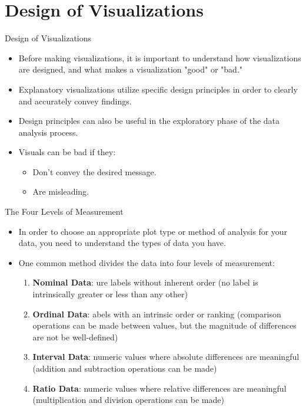 \documentclass[12pt]{beamer}
\begin{document}
    \section[Design of Visualizations]{Design of Visualizations}
    \begin{frame}{Design of Visualizations}
    	\begin{itemize}
    		\item Before making visualizations, it is important to understand how visualizations are designed, and what makes a visualization "good" or "bad."
    		\item Explanatory visualizations utilize specific design principles in order to clearly and accurately convey findings.
    		\item Design principles can also be useful in the exploratory phase of the data analysis process.
    		\item Visuals can be bad if they:
    		\begin{itemize}
    			\item Don't convey the desired message.
    			\item Are misleading.
    		\end{itemize}
    	\end{itemize}
    \end{frame} 
    \begin{frame}{The Four Levels of Measurement}
    	\begin{itemize}
    		\item In order to choose an appropriate plot type or method of analysis for your data, you need to understand the types of data you have.
    		\item One common method divides the data into four levels of measurement:
    		\begin{enumerate}
    			\item \textbf{Nominal Data}: ure labels without inherent order (no label is intrinsically greater or less than any other)
    			\item \textbf{Ordinal Data}: abels with an intrinsic order or ranking (comparison operations can be made between values, but the magnitude of differences are not be well-defined)
    			\item \textbf{Interval Data}: numeric values where absolute differences are meaningful (addition and subtraction operations can be made)
    			\item \textbf{Ratio Data}: numeric values where relative differences are meaningful (multiplication and division operations can be made) 
    		\end{enumerate}   	    
    	\end{itemize}
    \end{frame}
\end{document}
